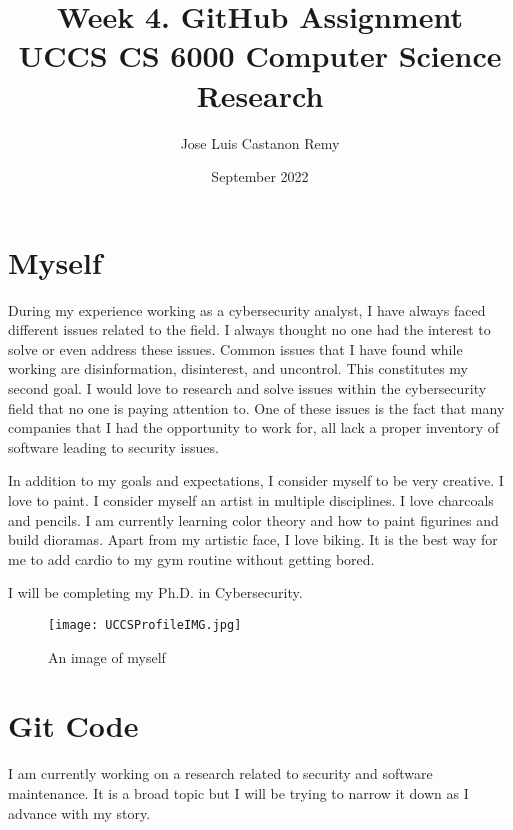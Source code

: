 
\title{Week 4. GitHub Assignment \\
\large UCCS CS 6000 Computer Science Research}
\author{Jose Luis Castanon Remy}
\date{September 2022}

%

\maketitle

\section{Myself}

During my experience working as a cybersecurity analyst, I have always faced different issues related to the field. I always thought no one had the interest to solve or even address these issues. Common issues that I have found while working are disinformation, disinterest, and uncontrol. This constitutes my second goal. I would love to research and solve issues within the cybersecurity field that no one is paying attention to. One of these issues is the fact that many companies that I had the opportunity to work for, all lack a proper inventory of software leading to security issues.



In addition to my goals and expectations, I consider myself to be very creative. I love to paint. I consider myself an artist in multiple disciplines. I love charcoals and pencils. I am currently learning color theory and how to paint figurines and build dioramas. Apart from my artistic face, I love biking. It is the best way for me to add cardio to my gym routine without getting bored.

I will be completing my Ph.D. in Cybersecurity.


\begin{figure}[htp]
    \centering
    \texttt{[image: UCCSProfileIMG.jpg]}
    \caption{An image of myself}
    \label{fig:myself}
\end{figure}


\section{Git Code}
I am currently working on a research related to security and software maintenance. It is a broad topic but I will be trying to narrow it down as I advance with my story.

